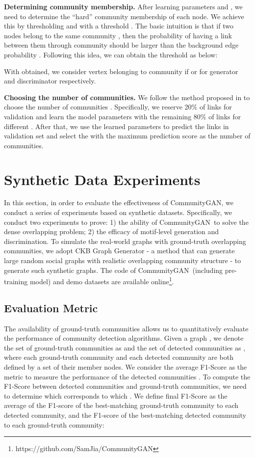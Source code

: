 \documentclass[sigconf]{acmart}
\newcommand{\ComGAN}{CommunityGAN}
\begin{document}
\vspace{5pt}\noindent\textbf{Determining community membership.} 
After learning parameters  and , we need to determine the ``hard'' community membership of each node.
We achieve this by thresholding  and  with a threshold .
The basic intuition is that if two nodes belong to the same community , then the probability of having a link between them through community  should be larger than the background edge probability .
Following this idea, we can obtain the threshold  as below:
 

With  obtained, we consider vertex  belonging to community  if  or  for generator  and discriminator  respectively. 

\vspace{5pt}\noindent\textbf{Choosing the number of communities.}
We follow the method proposed in \cite{airoldi2009mixed} to choose the number of communities .
Specifically, we reserve 20\% of links for validation and learn the model parameters with the remaining 80\% of links for different .
After that, we use the learned parameters to predict the links in validation set and select the  with the maximum prediction score as the number of communities. 



\section{Synthetic Data Experiments}

In this section, in order to evaluate the effectiveness of \ComGAN, we conduct a series of experiments based on synthetic datasets.
Specifically, we conduct two experiments to prove: 1) the ability of \ComGAN~to solve the dense overlapping problem; 2) the efficacy of motif-level generation and discrimination.
To simulate the real-world graphs with ground-truth overlapping communities, we adopt CKB Graph Generator - a method that can generate large random social graphs with realistic overlapping community structure \cite{ckb-benchmark} - to generate such synthetic graphs.
The code of \ComGAN~(including pre-training model) and demo datasets are available online\footnote{https://github.com/SamJia/CommunityGAN}.

\subsection{Evaluation Metric}
\label{subsection:evaluation metric}
The availability of ground-truth communities allows us to quantitatively evaluate the performance of community detection algorithms.
Given a graph , we denote the set of ground-truth communities as  and the set of detected communities as , where each ground-truth community  and each detected community  are both defined by a set of their member nodes.
We consider the average F1-Score as the metric to measure the performance of the detected communities .
To compute the F1-Score between detected communities and ground-truth communities, we need to determine which  corresponds to which .
We define final F1-Score as the average of the F1-score of the best-matching ground-truth community to each detected community, and the F1-score of the best-matching detected community to each ground-truth community:
\end{document}
